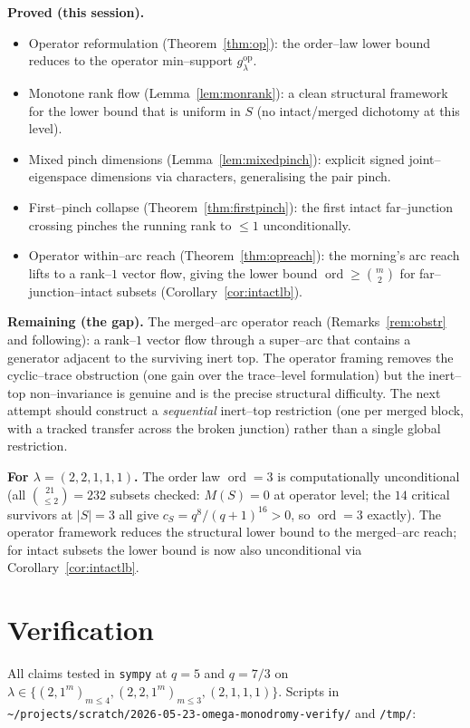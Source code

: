 \documentclass[11pt]{article}
\theoremstyle{definition}
\DeclareMathOperator{\ord}{ord}
\newcommand{\la}{\lambda}
\begin{document}
\textbf{Proved (this session).}
\begin{itemize}
\item Operator reformulation (Theorem~\ref{thm:op}): the order--law lower bound
reduces to the operator min--support $g^{\mathrm{op}}_\la$.
\item Monotone rank flow (Lemma~\ref{lem:monrank}): a clean structural framework
for the lower bound that is uniform in $S$ (no intact/merged dichotomy at this
level).
\item Mixed pinch dimensions (Lemma~\ref{lem:mixedpinch}): explicit signed
joint--eigenspace dimensions via characters, generalising the pair pinch.
\item First--pinch collapse (Theorem~\ref{thm:firstpinch}): the first intact
far--junction crossing pinches the running rank to $\le1$ unconditionally.
\item Operator within--arc reach (Theorem~\ref{thm:opreach}): the morning's
arc reach lifts to a rank--$1$ vector flow, giving the lower bound
$\ord\ge\binom m2$ for far--junction--intact subsets (Corollary~\ref{cor:intactlb}).
\end{itemize}

\textbf{Remaining (the gap).} The merged--arc operator reach
(Remarks~\ref{rem:obstr} and following): a rank--$1$ vector flow through a
super--arc that contains a generator adjacent to the surviving inert top.
The operator framing removes the cyclic--trace obstruction (one gain over
the trace--level formulation) but the inert--top non--invariance is genuine
and is the precise structural difficulty. The next attempt should construct
a \emph{sequential} inert--top restriction (one per merged block, with a
tracked transfer across the broken junction) rather than a single global
restriction.

\textbf{For $\la=(2,2,1,1,1)$.} The order law $\ord=3$ is computationally
unconditional (all $\binom{21}{\le2}=232$ subsets checked: $M(S)=0$ at
operator level; the $14$ critical survivors at $|S|=3$ all give
$c_S=q^8/(q+1)^{16}>0$, so $\ord=3$ exactly). The operator framework reduces
the structural lower bound to the merged--arc reach; for intact subsets the
lower bound is now also unconditional via Corollary~\ref{cor:intactlb}.

\section{Verification}

All claims tested in \texttt{sympy} at $q=5$ and $q=7/3$ on
$\la\in\{(2,1^m)_{m\le4},(2,2,1^m)_{m\le3},(2,1,1,1)\}$. Scripts in
\texttt{\~{}/projects/scratch/2026-05-23-omega-monodromy-verify/} and \texttt{/tmp/}:
\end{document}
